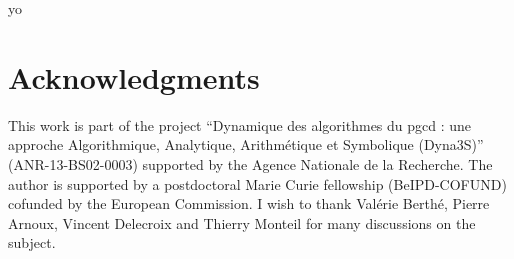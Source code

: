  yo

\section*{Acknowledgments}

This work is part of the project ``Dynamique des algorithmes du pgcd : une
approche Algorithmique, Analytique, Arithmétique et Symbolique (Dyna3S)''
(ANR-13-BS02-0003)  supported by the Agence Nationale de la Recherche. The
author is supported by a postdoctoral Marie Curie fellowship (BeIPD-COFUND)
cofunded by the European Commission. I wish to thank Valérie Berthé, Pierre
Arnoux, Vincent Delecroix and Thierry Monteil for many discussions on the
subject.


